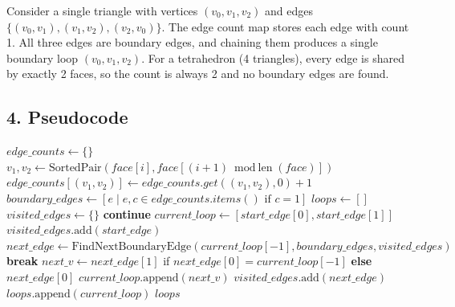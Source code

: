 \begin{example}\label{ex:boundary_detection}
Consider a single triangle with vertices $(v_0, v_1, v_2)$ and edges $\{(v_0,v_1), (v_1,v_2), (v_2,v_0)\}$. The edge count map stores each edge with count 1. All three edges are boundary edges, and chaining them produces a single boundary loop $(v_0, v_1, v_2)$. For a tetrahedron (4 triangles), every edge is shared by exactly 2 faces, so the count is always 2 and no boundary edges are found.
\end{example}

\subsection{4. Pseudocode}

\begin{algorithm}
\caption{Detect Mesh Boundaries}
\label{alg:detect_mesh_boundaries}
\begin{algorithmic}[1]
    \State $\mathit{edge\_counts} \gets \{\}$
            \State $v_1, v_2 \gets \text{SortedPair}(\mathit{face}[i], \mathit{face}[(i+1) \bmod \text{len}(\mathit{face})])$
            \State $\mathit{edge\_counts}[(v_1, v_2)] \gets \mathit{edge\_counts}.get((v_1, v_2), 0) + 1$
        \EndFor
    \EndFor
    \State $\mathit{boundary\_edges} \gets [e \mid e, c \in \mathit{edge\_counts}.items() \text{ if } c = 1]$
    \State $\mathit{loops} \gets []$
    \State $\mathit{visited\_edges} \gets \{\}$
            \State \textbf{continue}
        \EndIf
        \State $\mathit{current\_loop} \gets [\mathit{start\_edge}[0], \mathit{start\_edge}[1]]$
        \State $\mathit{visited\_edges}.\text{add}(\mathit{start\_edge})$
            \State $\mathit{next\_edge} \gets \text{FindNextBoundaryEdge}(\mathit{current\_loop}[-1], \mathit{boundary\_edges}, \mathit{visited\_edges})$
                \State \textbf{break}
            \EndIf
            \State $\mathit{next\_v} \gets \mathit{next\_edge}[1]$ if $\mathit{next\_edge}[0] = \mathit{current\_loop}[-1]$ \textbf{else} $\mathit{next\_edge}[0]$
            \State $\mathit{current\_loop}.\text{append}(\mathit{next\_v})$
            \State $\mathit{visited\_edges}.\text{add}(\mathit{next\_edge})$
        \EndWhile
        \State $\mathit{loops}.\text{append}(\mathit{current\_loop})$
    \EndFor
    \State \Return $\mathit{loops}$
\EndFunction
\end{algorithmic}
\end{algorithm}

